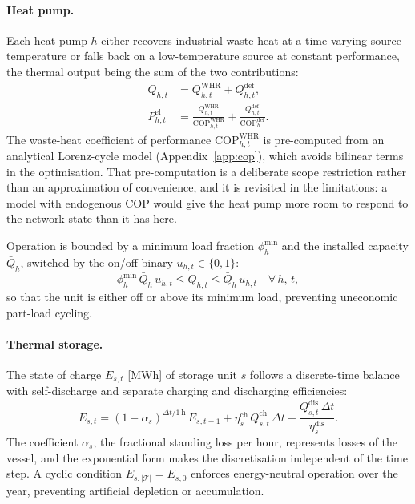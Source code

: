 \paragraph{Heat pump.}
Each heat pump $h$ either recovers industrial waste heat at a time-varying source
temperature or falls back on a low-temperature source at constant performance, the
thermal output being the sum of the two contributions:
\begin{align}
  Q_{h,t} &= Q_{h,t}^{\mathrm{WHR}} + Q_{h,t}^{\mathrm{def}},
  \label{eq:hp_split} \\[4pt]
  P_{h,t}^{\mathrm{el}} &= \frac{Q_{h,t}^{\mathrm{WHR}}}{
    \mathrm{COP}_{h,t}^{\mathrm{WHR}}}
    + \frac{Q_{h,t}^{\mathrm{def}}}{\mathrm{COP}_h^{\mathrm{def}}}.
  \label{eq:hp_pel}
\end{align}
The waste-heat coefficient of performance $\mathrm{COP}_{h,t}^{\mathrm{WHR}}$ is
pre-computed from an analytical Lorenz-cycle model
(Appendix~\ref{app:cop}), which avoids bilinear terms in the optimisation. That
pre-computation is a deliberate scope restriction rather than an approximation of
convenience, and it is revisited in the limitations: a model with endogenous COP would
give the heat pump more room to respond to the network state than it has here.

Operation is bounded by a minimum load fraction $\phi_h^{\mathrm{min}}$ and the installed
capacity $\bar{Q}_h$, switched by the on/off binary $u_{h,t} \in \{0,1\}$:
\begin{equation}
  \phi_h^{\mathrm{min}}\, \bar{Q}_h\, u_{h,t}
  \leq Q_{h,t} \leq \bar{Q}_h\, u_{h,t}
  \quad \forall\, h,\, t,
  \label{eq:hp_cap}
\end{equation}
so that the unit is either off or above its minimum load, preventing uneconomic part-load
cycling.

\paragraph{Thermal storage.}
The state of charge $E_{s,t}$ [MWh] of storage unit $s$ follows a discrete-time balance
with self-discharge and separate charging and discharging efficiencies:
\begin{equation}
  E_{s,t} = (1 - \alpha_s)^{\Delta t/\mathrm{1\,h}}\, E_{s,t-1}
    + \eta_s^{\mathrm{ch}}\, Q_{s,t}^{\mathrm{ch}}\, \Delta t
    - \frac{Q_{s,t}^{\mathrm{dis}}\, \Delta t}{\eta_s^{\mathrm{dis}}}.
  \label{eq:storage_soc}
\end{equation}
The coefficient $\alpha_s$, the fractional standing loss per hour, represents losses of
the vessel, and the exponential form makes the discretisation independent of the time step.
A cyclic condition $E_{s,|\mathcal{T}|} = E_{s,0}$ enforces energy-neutral operation over
the year, preventing artificial depletion or accumulation.

